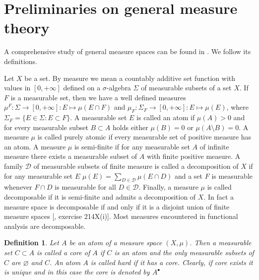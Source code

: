 \documentclass[12pt]{article}
\newtheorem{definition}[theorem]{Definition}
\begin{document}

\section{Preliminaries on general measure theory}
\label{SectionPreliminariesOnGeneralMeasureTheory}

A comprehensive study of general measure spaces can be found in \cite{FremMeasTh2}. We follow its definitions.

Let $X$ be a set. By measure we mean a countably additive set function with values in $[0,+\infty]$ defined on a $\sigma$-algebra $\Sigma$ of measurable subsets of a set $X$. If $F$ is a measurable set, then we have a well defined measures $\mu^F:\Sigma\to[0,+\infty]:E\mapsto \mu(E\cap F)$ and $\mu_F:\Sigma_F\to[0,+\infty]: E\mapsto \mu(E)$, where $\Sigma_F=\{E\in\Sigma:E\subset F\}$. A measurable set $E$ is called an atom if $\mu(A)>0$ and for every measurable subset $B\subset A$ holds either $\mu(B)=0$ or $\mu(A\setminus B)=0$. A measure $\mu$ is called purely atomic if every measurable set of positive measure has an atom. A measure $\mu$ is semi-finite if for any measurable set $A$ of infinite measure there exists a measurable subset of $A$ with finite positive measure. A family $\mathcal{D}$ of measurable subsets of finite measure is called a decomposition of $X$ if for any measurable set $E$ $\mu(E)=\sum_{D\in\mathcal{D}}\mu(E\cap D)$ and a set $F$ is measurable whenever $F\cap D$ is measurable for all $D\in\mathcal{D}$. Finally, a measure $\mu$ is called decomposable if it is semi-finite and admits a decomposition of $X$. In fact a measure space is decomposable if and only if it is a disjoint union of finite measure spaces [\cite{FremMeasTh2}, exercise 214X(i)]. Most measures encountered in functional analysis are decomposable.

\begin{definition}\label{AtomCore} Let $A$ be an atom of a measure space $(X,\mu)$. Then a measurable set $C\subset A$ is called a core of $A$ if $C$ is an atom and the only measurable subsets of $C$ are $\varnothing$ and $C$. An atom $A$ is called hard if it has a core. Clearly, if core exists it is unique and in this case the core is denoted by $A^\bullet$
\end{definition}
\end{document}
